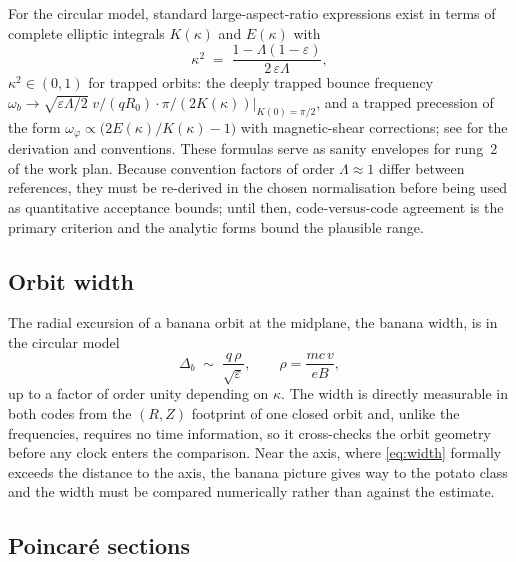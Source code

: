\documentclass[11pt,a4paper]{article}
\begin{document}
For the circular model, standard large-aspect-ratio expressions exist in
terms of complete elliptic integrals $K(\kappa)$ and $E(\kappa)$ with
\begin{equation}
  \kappa^2 \;=\; \frac{1-\Lambda(1-\varepsilon)}{2\,\varepsilon\Lambda},
\end{equation}
$\kappa^2 \in (0,1)$ for trapped orbits: the deeply trapped bounce frequency
$\omega_b \to \sqrt{\varepsilon\Lambda/2}\;v/(qR_0)\cdot
\pi/(2K(\kappa))\big|_{K(0)=\pi/2}$, and a trapped precession of the form
$\omega_\varphi \propto \bigl(2E(\kappa)/K(\kappa)-1\bigr)$ with magnetic-shear
corrections; see \citet{helander2002} for the derivation and conventions.
These formulas serve as sanity envelopes for rung~2 of the work plan. Because
convention factors of order $\Lambda \approx 1$ differ between references,
they must be re-derived in the chosen normalisation before being used as
quantitative acceptance bounds; until then, code-versus-code agreement is the
primary criterion and the analytic forms bound the plausible range.

\subsection{Orbit width}

The radial excursion of a banana orbit at the midplane, the banana width, is
in the circular model
\begin{equation}
  \Delta_b \;\sim\; \frac{q\,\rho}{\sqrt{\varepsilon}},
  \qquad \rho = \frac{m c\, v}{e B},
  \label{eq:width}
\end{equation}
up to a factor of order unity depending on $\kappa$. The width is directly
measurable in both codes from the $(R,Z)$ footprint of one closed orbit and,
unlike the frequencies, requires no time information, so it cross-checks the
orbit geometry before any clock enters the comparison. Near the axis, where
\eqref{eq:width} formally exceeds the distance to the axis, the banana picture
gives way to the potato class and the width must be compared numerically
rather than against the estimate.

\subsection{Poincar\'e sections}
\label{sec:poincare}
\end{document}
